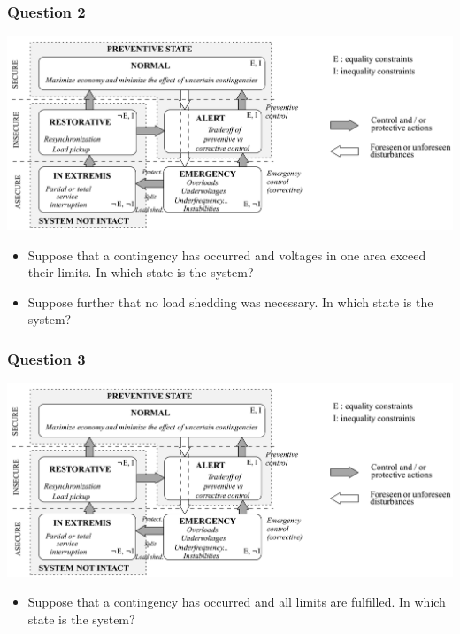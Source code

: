 \documentclass[compress]{beamer}
\begin{document}
\begin{frame}
  \frametitle{Question 2}
\includegraphics[width=\textwidth]{Figs/FinkCarlsen_SecurityDiagram.png}\\
\begin{itemize}
\item Suppose that a contingency has occurred and voltages in one area exceed their limits. In which state is the system?
\item Suppose further that no load shedding was necessary. In which state is the system?
\end{itemize}
\end{frame}

\begin{frame}
  \frametitle{Question 3}
\includegraphics[width=\textwidth]{Figs/FinkCarlsen_SecurityDiagram.png}\\
\begin{itemize}
\item Suppose that a contingency has occurred and all limits are fulfilled. In which state is the system?
\end{itemize}
\end{frame}
\end{document}

